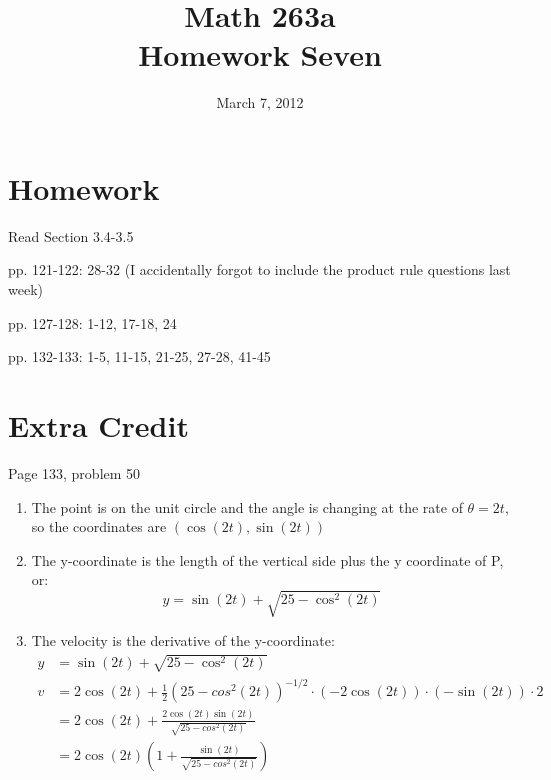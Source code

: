 \documentclass{exam}
\title{Math 263a \\ Homework Seven}
\date{March 7, 2012}
\begin{document}
\maketitle

\section{Homework}

\begin{itemize*}
  \item Read Section 3.4-3.5
  \item pp. 121-122: 28-32 (I accidentally forgot to include the product rule questions last week)
  \item pp. 127-128: 1-12, 17-18, 24
  \item pp. 132-133: 1-5, 11-15, 21-25, 27-28, 41-45
\end{itemize*}

\section{Extra Credit}
Page 133, problem 50

\ifprintanswers

\begin{enumerate}[a]

\item
The point is on the unit circle and the angle is changing at the rate of $\theta = 2t$, so the coordinates are
$(\cos(2t), \sin(2t))$

\item
{}

The y-coordinate is the length of the vertical side plus the y coordinate of P, or:
\[
  y = \sin(2t) + \sqrt{25 - \cos^2(2t)}
\]

\item
The velocity is the derivative of the y-coordinate:
\begin{align*}
  y &= \sin(2t) + \sqrt{25 - \cos^2(2t)} \\
  v &= 2 \cos(2t) + \frac{1}{2} (25 - cos^2(2t))^{-1/2} \cdot (-2 \cos(2t)) \cdot (- \sin(2t)) \cdot 2 \\
    &= 2 \cos(2t) + \frac{2 \cos(2t) \sin(2t)} {\sqrt{25 - cos^2(2t)}} \\
    &= 2 \cos(2t) \left(1 + \frac{\sin(2t)} {\sqrt{25 - cos^2(2t)}} \right) \\
\end{align*}
\end{enumerate}
\end{document}
